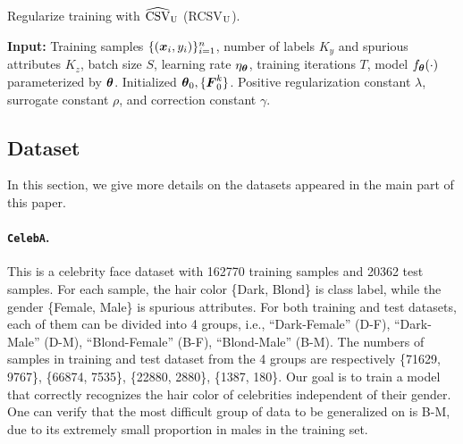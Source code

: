 \begin{algorithm}[h]
	\caption{Regularize training with $\widehat{\rm{CSV}}_{\rm U}$ (RCSV$_{\rm U}$).}
	\label{alg:RCSV2}
	\textbf{Input:} Training samples $\{(\boldsymbol{x}_{i}, y_{i})\}_{i=1}^{n}$, number of labels $K_{y}$ and spurious attributes $K_{z}$, batch size $S$, learning rate $\eta_{\text{\boldmath{$\theta$}}}$, training iterations $T$, model $f_{\text{\boldmath{$\theta$}}}(\cdot)$ parameterized by $\text{\boldmath{$\theta$}}$. Initialized $\text{\boldmath{$\theta$}}_{0}, \{\boldsymbol{F}^{k}_{0}\}$. Positive regularization constant $\lambda$, surrogate constant $\rho$, and correction constant $\gamma$. 
	
	\begin{algorithmic}[1]
		\ENDFOR
	\end{algorithmic}
\end{algorithm}

\subsection{Dataset}\label{app:dataset}
In this section, we give more details on the datasets appeared in the main part of this paper.
\paragraph{\texttt{CelebA}.} This is a celebrity face dataset \citep{liu2015deep} with 162770 training samples and 20362 test samples. For each sample, the hair color \{Dark, Blond\} is class label, while the gender \{Female, Male\} is spurious attributes. For both training and test datasets, each of them can be divided into 4 groups, i.e., ``Dark-Female'' (D-F), ``Dark-Male'' (D-M), ``Blond-Female'' (B-F), ``Blond-Male'' (B-M). The numbers of samples in training and test dataset from the 4 groups are respectively \{71629, 9767\}, \{66874, 7535\}, \{22880, 2880\}, \{1387, 180\}. Our goal is to train a model that correctly recognizes the hair color of celebrities independent of their gender. One can verify that the most difficult group of data to be generalized on is B-M, due to its extremely small proportion in males in the training set. 
